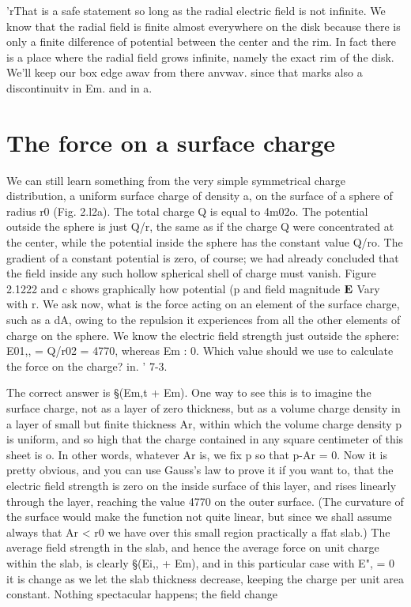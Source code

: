 'rThat is a safe statement so long as the radial electric field is not infinite. We know
that the radial field is finite almost everywhere on the disk because there is only a finite
dilference of potential between the center and the rim. In fact there is a place where
the radial field grows infinite, namely the exact rim of the disk. We'll keep our box
edge awav from there anvwav. since that marks also a discontinuitv in Em. and in a.

\iffalse

\section{The force on a surface charge}

We can still learn something from the very simple symmetrical
charge distribution, a uniform surface charge of density a, on the
surface of a sphere of radius r0 (Fig. 2.l2a). The total charge Q is
equal to 4m02o. The potential outside the sphere is just Q/r, the
same as if the charge Q were concentrated at the center, while the
potential inside the sphere has the constant value Q/ro. The gradient
of a constant potential is zero, of course; we had already concluded
that the field inside any such hollow spherical shell of charge must
vanish. Figure 2.1222 and c shows graphically how potential (p and
field magnitude $\mathbf{E}$ Vary with r. We ask now, what is the force acting
on an element of the surface charge, such as a dA, owing to the repulsion
it experiences from all the other elements of charge on the
sphere. We know the electric field strength just outside the sphere:
E01,, = Q/r02 = 4770, whereas Em : 0. Which value should we use
to calculate the force on the charge? in. ' 7-3.

The correct answer is §(Em,t + Em). One way to see this is to
imagine the surface charge, not as a layer of zero thickness, but as a
volume charge density in a layer of small but finite thickness Ar,
within which the volume charge density p is uniform, and so high that
the charge contained in any square centimeter of this sheet is o. In
other words, whatever Ar is, we fix p so that p-Ar = 0. Now it is
pretty obvious, and you can use Gauss's law to prove it if you want to,
that the electric field strength is zero on the inside surface of this
layer, and rises linearly through the layer, reaching the value 4770 on
the outer surface. (The curvature of the surface would make the
function not quite linear, but since we shall assume always that
Ar < r0 we have over this small region practically a ffat slab.) The
average field strength in the slab, and hence the average force on unit
charge within the slab, is clearly §(Ei,, + Em), and in this particular
case with E", = 0 it is %
change as we let the slab thickness decrease, keeping the charge per
unit area constant. Nothing spectacular happens; the field change

